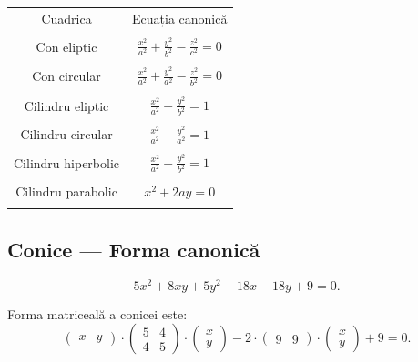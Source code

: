 \begin{center}
  \begin{tabular}{| c | c |}
    \hline
    Cuadrica & Ecuația canonică \\ & \\
    \hline
    Con eliptic & $\frac{x^2}{a^2} + \frac{y^2}{b^2} - \frac{z^2}{c^2} = 0$ \\ & \\
    Con circular & $\frac{x^2}{a^2} + \frac{y^2}{a^2} - \frac{z^2}{b^2} = 0$ \\ & \\
    Cilindru eliptic & $\frac{x^2}{a^2} + \frac{y^2}{b^2} = 1$ \\ & \\
    Cilindru circular & $\frac{x^2}{a^2} + \frac{y^2}{a^2} = 1$ \\ & \\
    Cilindru hiperbolic & $\frac{x^2}{a^2} - \frac{y^2}{b^2} = 1$ \\ & \\
    Cilindru parabolic & $x^2 + 2ay = 0$ \\ & \\
    \hline
  \end{tabular}
\end{center}



\subsection{Conice --- Forma canonică}
\label{sec:conice-canonica}

\[
  5x^2 + 8xy + 5y^2 - 18x - 18y + 9 = 0.
\]

Forma matriceală a conicei este:
\[
  \begin{pmatrix}
    x & y
  \end{pmatrix} \cdot
  \begin{pmatrix}
    5 & 4 \\
    4 & 5 
  \end{pmatrix} \cdot
  \begin{pmatrix}
    x \\ y
  \end{pmatrix} - 2 \cdot
  \begin{pmatrix}
    9 & 9
  \end{pmatrix} \cdot
  \begin{pmatrix}
    x \\ y
  \end{pmatrix} + 9 = 0.
\]

